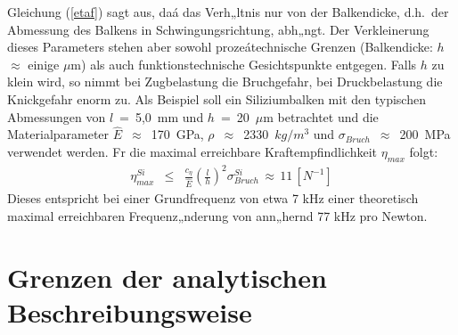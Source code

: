 %
Gleichung (\ref{etaf}) sagt aus, daá das Verh„ltnis nur von der
Balkendicke, d.h.\ der Abmessung des Balkens in Schwingungsrichtung, abh„ngt.
Der Verkleinerung dieses Parameters stehen aber sowohl prozeátechnische
Grenzen (Balkendicke: $h$ $\approx$ einige $\mu$m) als auch
funktionstechnische Gesichtspunkte entgegen. Falls $h$ zu klein wird, so
nimmt bei Zugbelastung die Bruchgefahr, bei Druckbelastung die
Knickgefahr enorm zu. Als Beispiel soll ein Siliziumbalken mit den
typischen Abmessungen von $l$~=~5,0~mm und $h$~=~20~$\mu$m betrachtet
und die Materialparameter $\hat E$~$\approx$~170~GPa,
$\rho$~$\approx$~2330~$kg/m^{3}$ und $\sigma_{Bruch}$~$\approx$~200~MPa
verwendet werden. Fr die maximal erreichbare Kraftempfindlichkeit
$\eta_{max}$ folgt:
%
\begin{eqnarray}
     \eta_{max}^{Si} & \leq & \frac{c_{\eta}}{\hat E}
     \left( \frac{l}{h} \right)^{2} \sigma_{Bruch}^{Si} \,
      \approx \, 11 \, [N^{-1}]
\end{eqnarray}
%
Dieses entspricht bei einer Grundfrequenz von etwa 7 kHz einer
theoretisch maximal erreichbaren Frequenz„nderung von ann„hernd 77 kHz
pro Newton.


\newpage
\section{Grenzen der analytischen Beschreibungsweise}
\label{grenzenderanalytik}

